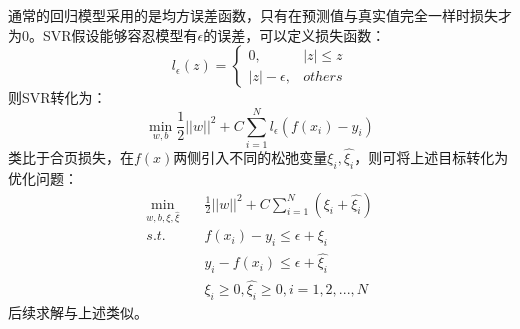 通常的回归模型采用的是均方误差函数，只有在预测值与真实值完全一样时损失才为0。SVR假设能够容忍模型有$\epsilon$的误差，可以定义损失函数：
$$
l_\epsilon (z) = \begin{cases}0, &|z| \leq z \\ |z| - \epsilon, &others \end{cases}
$$
则SVR转化为：
$$
\mathop{min}_{w, b} \frac{1}{2} ||w||^2 + C \sum_{i=1}^N l_\epsilon (f(x_i) - y_i) 
$$
类比于合页损失，在$f(x)$两侧引入不同的松弛变量$\xi_i, \hat{\xi_i}$，则可将上述目标转化为优化问题：
\begin{align}
	\mathop{min}_{w, b, \xi, \hat{\xi}}\quad &\frac{1}{2} ||w||^2 + C \sum_{i=1}^{N} (\xi_i + \hat{\xi_i}) \nonumber \\
	s.t.\quad &f(x_i) - y_i \leq \epsilon + \xi_i \nonumber \\
			  &y_i - f(x_i) \leq \epsilon + \hat{\xi_i} \nonumber \\
			  &\xi_i \geq 0, \hat{\xi_i} \geq 0, i = 1, 2, ..., N \nonumber
\end{align}
后续求解与上述类似。